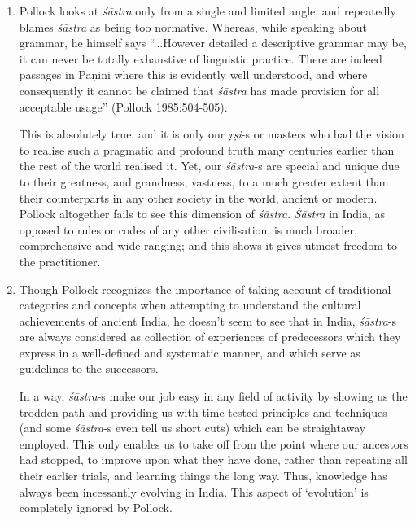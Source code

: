 \begin{enumerate}
\item Pollock looks at {\it śāstra} only from a single and limited angle; and repeatedly blames {\it śāstra} as being too normative. Whereas, while speaking about grammar, he himself says ``...However detailed a descriptive grammar may be, it can never be totally exhaustive of linguistic practice. There are indeed passages in Pāṇini where this is evidently well understood, and where consequently it cannot be claimed that {\it śāstra} has made provision for all acceptable usage'' (Pollock 1985:504-505). 

This is absolutely true, and it is only our {\it ṛṣi}-s or masters who had the vision to realise such a pragmatic and profound truth many centuries earlier than the rest of the world realised it.  Yet, our {\it śāstra}-s are special and unique due to their greatness, and grandness, vastness, to a much greater extent than their counterparts in any other society in the world, ancient or modern. Pollock altogether fails to see this dimension of {\it śāstra}. {\it Śāstra} in India, as opposed to rules or codes of any other civilisation, is much broader, comprehensive and wide-ranging; and this shows it gives utmost freedom to the practitioner.

\item Though Pollock recognizes the importance of taking account of traditional categories and concepts when attempting to understand the cultural achievements of ancient India, he doesn't seem to see that in India, {\it śāstra}-s are always considered as collection of experiences of predecessors which they express in a well-defined and systematic manner, and which serve as guidelines to the successors. 

In a way, {\it śāstra}-s make our job easy in any field of activity by showing us the trodden path and providing us with time-tested principles and techniques (and some {\it śāstra}-s even tell us short cuts) which can be straightaway employed. This only enables us to take off from the point where our ancestors had stopped, to improve upon what they have done, rather than repeating all their earlier trials, and learning things the long way. Thus, knowledge has always been incessantly evolving in India. This aspect of `evolution' is completely ignored by Pollock.


\end{enumerate}

